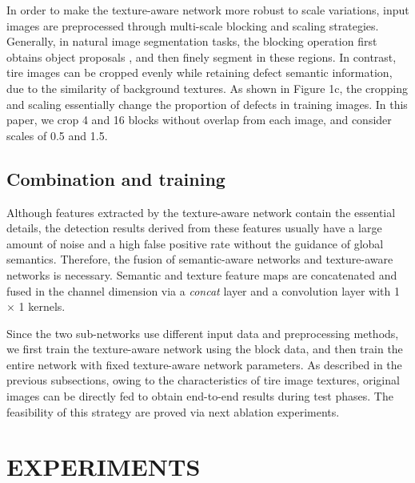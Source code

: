 \documentclass{article}
\begin{document}
In order to make the texture-aware network more robust to scale variations, input images are preprocessed through multi-scale blocking and scaling strategies. Generally, in natural image segmentation tasks, the blocking operation first obtains object proposals \cite{girshick2014rich,ren2015faster}, and then finely segment in these regions. In contrast, tire images can be cropped evenly while retaining defect semantic information, due to the similarity of background textures. As shown in Figure 1c, the cropping and scaling essentially change the proportion of defects in training images. In this paper, we crop 4 and 16 blocks without overlap from each image, and consider scales of 0.5 and 1.5.


\subsection{Combination and training}
\label{Combination and training}

Although features extracted by the texture-aware network contain the essential details, the detection results derived from these features usually have a large amount of noise and a high false positive rate without the guidance of global semantics. Therefore, the fusion of semantic-aware networks and texture-aware networks is necessary. Semantic and texture feature maps are concatenated and fused in the channel dimension via a {\it concat} layer and a convolution layer with 1 $\times$ 1 kernels.

Since the two sub-networks use different input data and preprocessing methods, we first train the texture-aware network using the block data, and then train the entire network with fixed texture-aware network parameters. As described in the previous subsections, owing to the characteristics of tire image textures, original images can be directly fed to obtain end-to-end results during test phases. The feasibility of this strategy are proved via next ablation experiments.


\section{EXPERIMENTS}
\label{sec:pagestyle}
\end{document}
